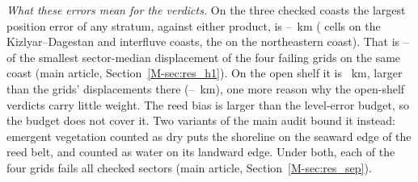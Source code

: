\emph{What these errors mean for the verdicts.} On the three checked coasts the largest position error of any stratum, against either product, is --~km ( cells on the Kizlyar--Dagestan and interfluve coasts, the  on the northeastern coast). That is -- of the smallest sector-median displacement of the four failing grids on the same coast (main article, Section~\ref{M-sec:res_h1}). On the open shelf it is ~km, larger than the grids' displacements there (--~km), one more reason why the open-shelf verdicts carry little weight. The reed bias is larger than the level-error budget, so the budget does not cover it. Two variants of the main audit bound it instead: emergent vegetation counted as dry puts the shoreline on the seaward edge of the reed belt, and counted as water on its landward edge. Under both, each of the four grids fails all  checked sectors (main article, Section~\ref{M-sec:res_sep}).

